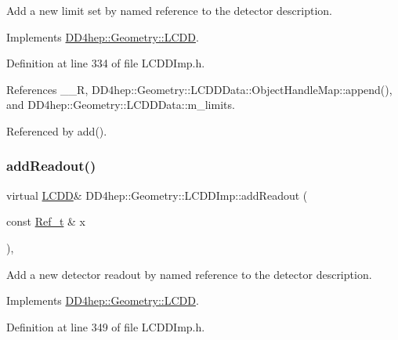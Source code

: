 Add a new limit set by named reference to the detector description. 



Implements \hyperlink{class_d_d4hep_1_1_geometry_1_1_l_c_d_d_af11d7a6aaeb91256f14d5892d84e2b30}{D\+D4hep\+::\+Geometry\+::\+L\+C\+DD}.



Definition at line 334 of file L\+C\+D\+D\+Imp.\+h.



References \+\_\+\+\_\+R, D\+D4hep\+::\+Geometry\+::\+L\+C\+D\+D\+Data\+::\+Object\+Handle\+Map\+::append(), and D\+D4hep\+::\+Geometry\+::\+L\+C\+D\+D\+Data\+::m\+\_\+limits.



Referenced by add().

\hypertarget{class_d_d4hep_1_1_geometry_1_1_l_c_d_d_imp_a876f792d25fd05a99646cd6c0df77d09}{}\label{class_d_d4hep_1_1_geometry_1_1_l_c_d_d_imp_a876f792d25fd05a99646cd6c0df77d09} 
\subsubsection{\texorpdfstring{add\+Readout()}{addReadout()}}
{\footnotesize\ttfamily virtual \hyperlink{class_d_d4hep_1_1_geometry_1_1_l_c_d_d}{L\+C\+DD}\& D\+D4hep\+::\+Geometry\+::\+L\+C\+D\+D\+Imp\+::add\+Readout (\begin{DoxyParamCaption}\item[{const \hyperlink{group___d_d4_h_e_p___g_e_o_m_e_t_r_y_ga40af83be6718bb8828a3d83dc7f8c930}{Ref\+\_\+t} \&}]{x }\end{DoxyParamCaption})\hspace{0.3cm}{\ttfamily [inline]}, {\ttfamily [virtual]}}



Add a new detector readout by named reference to the detector description. 



Implements \hyperlink{class_d_d4hep_1_1_geometry_1_1_l_c_d_d_a9823ad063bd9986e92e66c29f13e28f7}{D\+D4hep\+::\+Geometry\+::\+L\+C\+DD}.



Definition at line 349 of file L\+C\+D\+D\+Imp.\+h.



